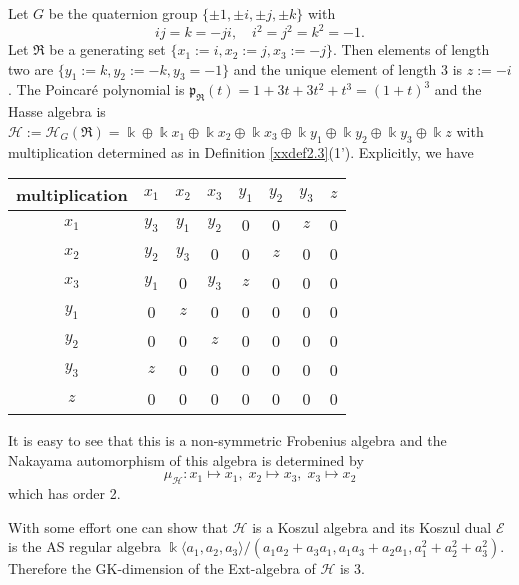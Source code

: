 \begin{example}
\label{xxex2.5} 
Let $G$ be the quaternion group $\{\pm 1, \pm i, \pm j, \pm k\}$
with 
$$ij=k=-ji, \quad i^2=j^2=k^2=-1.$$ Let $\Re$ be a generating set 
$\{x_1:=i, x_2:=j, x_3:=-j\}$. 
Then elements of length two are $\{y_1:=k, y_2:= -k, y_3=-1\}$
and the unique element of length 3 is $z:=-i$. The Poincar{\'e} 
polynomial is ${\mathfrak{p}}_\Re(t)=1+3t+3t^2+t^3=(1+t)^3$ and the Hasse algebra 
is ${\mathcal H}:={\mathcal H}_G(\Re)=\Bbbk \oplus  \Bbbk x_1\oplus \Bbbk x_2
\oplus \Bbbk x_3\oplus \Bbbk y_1\oplus \Bbbk y_2\oplus \Bbbk y_3\oplus \Bbbk z$ 
with multiplication determined as in Definition \ref{xxdef2.3}(1').
Explicitly, we have

\begin{center}
\begin{tabular}{|c|c|c|c|c|c|c|c|}\hline
multiplication & $x_1$ & $x_2$ & $x_3$ & $y_1$ & $y_2$ & $y_3$ & $z$ 
\\ \hline
$x_1$ &  $y_3$ & $y_1$ & $y_2$ & 0 & 0   & $z$ & 0 \\ \hline
$x_2$ &  $y_2$ & $y_3$ & 0     & 0 & $z$ & 0   & 0\\ \hline
$x_3$ &  $y_1$ & 0     & $y_3$ & $z$ & 0 & 0   & 0\\ \hline
$y_1$ &  0     & $z$   & 0     & 0& 0& 0& 0\\ \hline
$y_2$ &  0     & 0     & $z$   & 0& 0& 0& 0\\ \hline
$y_3$ &  $z$   & 0     & 0     & 0& 0& 0& 0\\ \hline
$z$ &  0 &0  &0  &0  &0  &0  &0 \\ \hline
\end{tabular}
\end{center}

It is easy to see that this is a non-symmetric Frobenius algebra and the Nakayama
automorphism of this algebra is determined by
$$\mu_{\mathcal H}: x_1\mapsto x_1, \; x_2\mapsto x_3, \; x_3\mapsto x_2
$$
which has order 2. 

With some effort one can show that ${\mathcal H}$ is a Koszul algebra
and its Koszul dual ${\mathcal E}$ is the AS regular algebra $\Bbbk\langle a_1,a_2,a_3\rangle
/(a_1a_2+a_3a_1, a_1a_3+a_2a_1, a_1^2+a_2^2+a_3^2)$. Therefore the 
GK-dimension of the Ext-algebra of ${\mathcal H}$ is 3.
\end{example}

